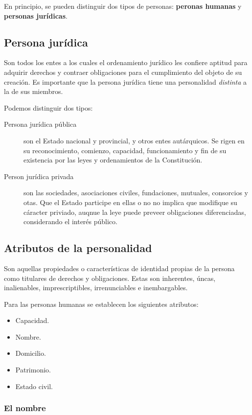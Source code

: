\documentclass[../resumen.tex]{subfiles}
\begin{document}
En principio, se pueden distinguir dos tipos de personas: \textbf{peronas humanas}
y \textbf{personas jurídicas}.

\subsection{Persona jurídica}
Son todos los entes a los cuales el ordenamiento jurídico les confiere aptitud para
adquirir derechos y contraer obligaciones para el cumplimiento del objeto de su 
creación. Es importante que la persona jurídica tiene una personalidad \textit{distinta}
a la de sus miembros.

Podemos distinguir dos tipos:

\begin{description}
  \item[Persona jurídica pública] son el Estado nacional y provincial, 
      y otros entes autárquicos. Se rigen en su reconocimiento, comienzo, capacidad,
      funcionamiento y fin de su existencia por las leyes y ordenamientos de la
      Constitución.
  \item[Person jurídica privada] son las sociedades, asociaciones civiles, fundaciones,
    mutuales, consorcios y otas. Que el Estado participe en ellas o no no implica que
    modifique su cáracter priviado, auqnue la leye puede preveer obligaciones
    diferenciadas, considerando el interés público.
\end{description}

\subsection{Atributos de la personalidad}

Son aquellas propiedades o características de identidad propias de la persona 
como titulares de derechos y obligaciones. Estas son inherentes, úncas, inalienables,
imprescriptibles, irrenunciables e inembargables.

Para las personas humanas se establecen los siguientes atributos:

\begin{itemize}
  \item Capacidad.
  \item Nombre.
  \item Domicilio.
  \item Patrimonio.
  \item Estado civil.
\end{itemize}

\subsubsection{El nombre}
\end{document}
